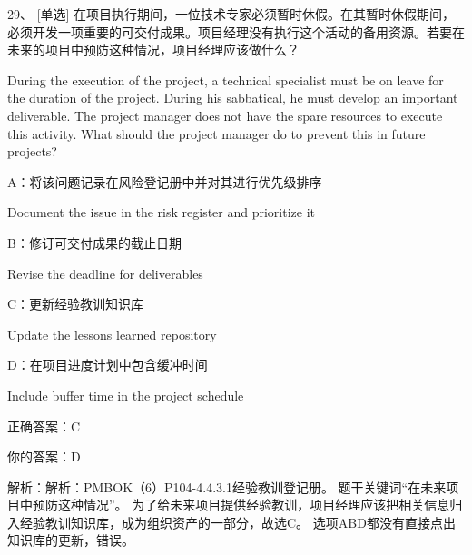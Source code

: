 29、 [单选] 在项目执行期间，一位技术专家必须暂时休假。在其暂时休假期间，必须开发一项重要的可交付成果。项目经理没有执行这个活动的备用资源。若要在未来的项目中预防这种情况，项目经理应该做什么？

During the execution of the project, a technical specialist must be on leave for the duration of the project. During his sabbatical, he must develop an important deliverable. The project manager does not have the spare resources to execute this activity. What should the project manager do to prevent this in future projects?

A：将该问题记录在风险登记册中并对其进行优先级排序

Document the issue in the risk register and prioritize it

B：修订可交付成果的截止日期

Revise the deadline for deliverables

C：更新经验教训知识库

Update the lessons learned repository

D：在项目进度计划中包含缓冲时间

Include buffer time in the project schedule

正确答案：C

你的答案：D

解析：解析：PMBOK（6）P104-4.4.3.1经验教训登记册。 题干关键词“在未来项目中预防这种情况”。 为了给未来项目提供经验教训，项目经理应该把相关信息归入经验教训知识库，成为组织资产的一部分，故选C。 选项ABD都没有直接点出知识库的更新，错误。

